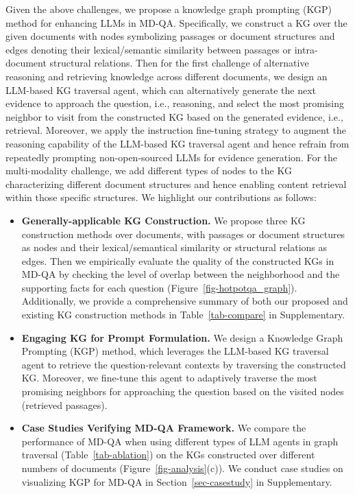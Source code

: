Given the above challenges, we propose a knowledge graph prompting (KGP) method for enhancing LLMs in MD-QA. Specifically, we construct a KG over the given documents with nodes symbolizing passages or document structures and edges denoting their lexical/semantic similarity between passages or intra-document structural relations. Then for the first challenge of alternative reasoning and retrieving knowledge across different documents, we design an LLM-based KG traversal agent, which can alternatively generate the next evidence to approach the question, i.e., reasoning, and select the most promising neighbor to visit from the constructed KG based on the generated evidence, i.e., retrieval. Moreover, we apply the instruction fine-tuning strategy to augment the reasoning capability of the LLM-based KG traversal agent and hence refrain from repeatedly prompting non-open-sourced LLMs for evidence generation. For the multi-modality challenge, we add different types of nodes to the KG characterizing different document structures and hence enabling content retrieval within those specific structures. We highlight our contributions as follows:


\begin{itemize}[leftmargin=*]
    \item \textbf{Generally-applicable KG Construction.} We propose three KG construction methods over documents, with passages or document structures as nodes and their lexical/semantical similarity or structural relations as edges. Then we empirically evaluate the quality of the constructed KGs in MD-QA by checking the level of overlap between the neighborhood and the supporting facts for each question (Figure~\ref{fig-hotpotqa_graph}). Additionally, we provide a comprehensive summary of both our proposed and existing KG construction methods in Table~\ref{tab-compare} in Supplementary.
    

    \item \textbf{Engaging KG for Prompt Formulation.} We design a Knowledge Graph Prompting (KGP) method, which leverages the LLM-based KG traversal agent to retrieve the question-relevant contexts by traversing the constructed KG. Moreover, we fine-tune this agent to adaptively traverse the most promising neighbors for approaching the question based on the visited nodes (retrieved passages).

    \item \textbf{Case Studies Verifying MD-QA Framework.} We compare the performance of MD-QA when using different types of LLM agents in graph traversal (Table~\ref{tab-ablation}) on the KGs constructed over different numbers of documents (Figure~\ref{fig-analysis}(c)). We conduct case studies on visualizing KGP for MD-QA in Section~\ref{sec-casestudy} in Supplementary.
\end{itemize}




